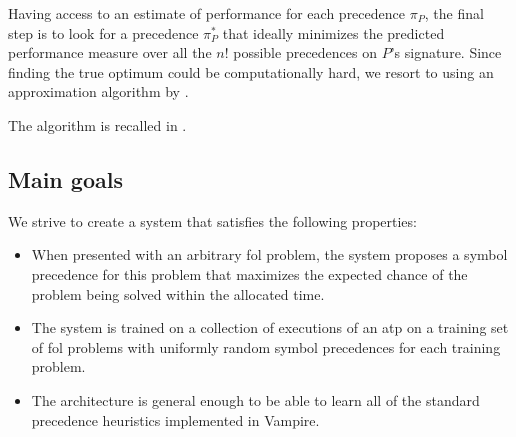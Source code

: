 \documentclass{ceurart}
\begin{document}
Having access to an estimate of performance for each precedence $\pi_P$, the final step 
is to look for a precedence $\pi^*_P$ that ideally minimizes the predicted performance measure 
over all the $n!$ possible precedences on $P$'s signature. Since finding the true
optimum could be computationally hard, we resort to using an approximation algorithm by \citet{Cohen2011}.

The algorithm is recalled in .



\iffalse

\subsection{Main goals}

We strive to create a system that satisfies the following properties:

\begin{itemize}
	\item When presented with an arbitrary \gls{fol} problem,
	the system proposes a symbol precedence for this problem
	that maximizes the expected chance of the problem being solved
	within the allocated time.
	
	\item The system is trained on a collection of executions of an \gls{atp}
	on a training set of \gls{fol} problems
	with uniformly random symbol precedences for each training problem.
	
	\item The architecture is general enough to be able to learn
	all of the standard precedence heuristics implemented in Vampire.\cite{?}
\end{itemize}

\end{document}

